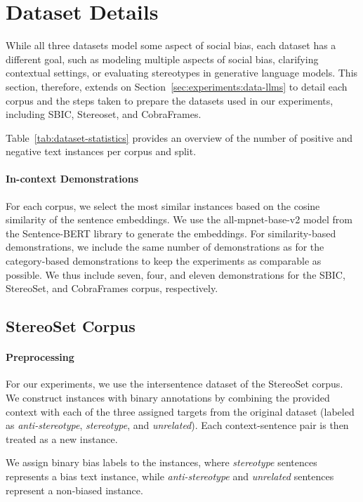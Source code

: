 \section{Dataset Details}
\label{sec:appendix-data-details}

While all three datasets model some aspect of social bias, each dataset has a different goal, such as modeling multiple aspects of social bias, clarifying contextual settings, or evaluating stereotypes in generative language models. This section, therefore, extends on Section~\ref{sec:experiments:data-llms} to detail each corpus and the steps taken to prepare the datasets used in our experiments, including SBIC, Stereoset, and CobraFrames.

Table~\ref{tab:dataset-statistics} provides an overview of the number of positive and negative text instances per corpus and split.

\paragraph{In-context Demonstrations}
For each corpus, we select the most similar instances based on the cosine similarity of the sentence embeddings. We use the all-mpnet-base-v2 model from the Sentence-BERT library \cite{reimers2019} to generate the embeddings. For similarity-based demonstrations, we include the same number of demonstrations as for the category-based demonstrations to keep the experiments as comparable as possible. We thus include seven, four, and eleven demonstrations for the SBIC, StereoSet, and CobraFrames corpus, respectively.



\subsection{StereoSet Corpus}
\paragraph{Preprocessing}
For our experiments, we use the intersentence dataset of the StereoSet corpus. We construct instances with binary annotations by combining the provided context with each of the three assigned targets from the original dataset (labeled as \textit{anti-stereotype}, \textit{stereotype}, and \textit{unrelated}). Each context-sentence pair is then treated as a new instance.

We assign binary bias labels to the instances, where \textit{stereotype} sentences represents a bias text instance, while \textit{anti-stereotype} and \textit{unrelated} sentences represent a non-biased instance.

